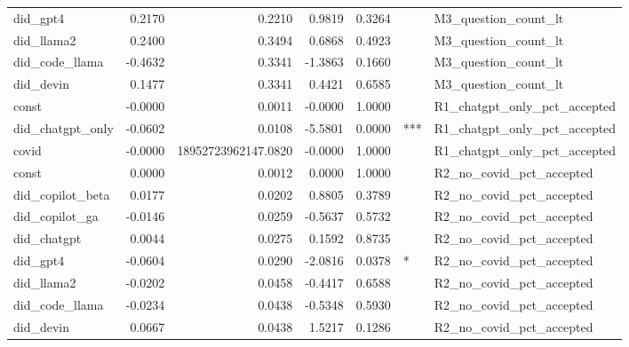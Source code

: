\begin{tabular}{lrrrrll}
did_gpt4 & 0.2170 & 0.2210 & 0.9819 & 0.3264 &  & M3_question_count_lt \\
did_llama2 & 0.2400 & 0.3494 & 0.6868 & 0.4923 &  & M3_question_count_lt \\
did_code_llama & -0.4632 & 0.3341 & -1.3863 & 0.1660 &  & M3_question_count_lt \\
did_devin & 0.1477 & 0.3341 & 0.4421 & 0.6585 &  & M3_question_count_lt \\
const & -0.0000 & 0.0011 & -0.0000 & 1.0000 &  & R1_chatgpt_only_pct_accepted \\
did_chatgpt_only & -0.0602 & 0.0108 & -5.5801 & 0.0000 & *** & R1_chatgpt_only_pct_accepted \\
covid & -0.0000 & 18952723962147.0820 & -0.0000 & 1.0000 &  & R1_chatgpt_only_pct_accepted \\
const & 0.0000 & 0.0012 & 0.0000 & 1.0000 &  & R2_no_covid_pct_accepted \\
did_copilot_beta & 0.0177 & 0.0202 & 0.8805 & 0.3789 &  & R2_no_covid_pct_accepted \\
did_copilot_ga & -0.0146 & 0.0259 & -0.5637 & 0.5732 &  & R2_no_covid_pct_accepted \\
did_chatgpt & 0.0044 & 0.0275 & 0.1592 & 0.8735 &  & R2_no_covid_pct_accepted \\
did_gpt4 & -0.0604 & 0.0290 & -2.0816 & 0.0378 & * & R2_no_covid_pct_accepted \\
did_llama2 & -0.0202 & 0.0458 & -0.4417 & 0.6588 &  & R2_no_covid_pct_accepted \\
did_code_llama & -0.0234 & 0.0438 & -0.5348 & 0.5930 &  & R2_no_covid_pct_accepted \\
did_devin & 0.0667 & 0.0438 & 1.5217 & 0.1286 &  & R2_no_covid_pct_accepted \\
\bottomrule
\end{tabular}
